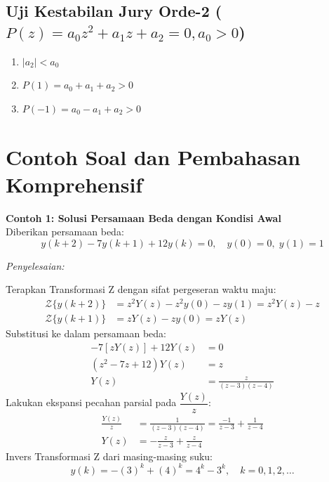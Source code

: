 \documentclass[11pt,a4paper]{article}
\begin{document}
\subsection{Uji Kestabilan Jury Orde-2 (\texorpdfstring{$P(z) = a_0 z^2 + a_1 z + a_2 = 0, a_0 > 0$}{P(z)})}
\begin{enumerate}
    \item $|a_2| < a_0$
    \item $P(1) = a_0 + a_1 + a_2 > 0$
    \item $P(-1) = a_0 - a_1 + a_2 > 0$
\end{enumerate}

\vspace{6pt}

\section{Contoh Soal dan Pembahasan Komprehensif}

\noindent\textbf{Contoh 1: Solusi Persamaan Beda dengan Kondisi Awal}\\
Diberikan persamaan beda:
\begin{equation*}
    y(k+2) - 7y(k+1) + 12y(k) = 0, \quad y(0) = 0, \; y(1) = 1
\end{equation*}

\textit{Penyelesaian:}

Terapkan Transformasi Z dengan sifat pergeseran waktu maju:
\begin{align*}
    \mathcal{Z}\{y(k+2)\} &= z^2 Y(z) - z^2 y(0) - z y(1) = z^2 Y(z) - z \\
    \mathcal{Z}\{y(k+1)\} &= z Y(z) - z y(0) = z Y(z)
\end{align*}
Substitusi ke dalam persamaan beda:
\begin{align*}
    [z^2 Y(z) - z] - 7 [z Y(z)] + 12 Y(z) &= 0 \\
    (z^2 - 7z + 12) Y(z) &= z \\
    Y(z) &= \frac{z}{(z-3)(z-4)}
\end{align*}
Lakukan ekspansi pecahan parsial pada $\dfrac{Y(z)}{z}$:
\begin{align*}
    \frac{Y(z)}{z} &= \frac{1}{(z-3)(z-4)} = \frac{-1}{z-3} + \frac{1}{z-4} \\
    Y(z) &= -\frac{z}{z-3} + \frac{z}{z-4}
\end{align*}
Invers Transformasi Z dari masing-masing suku:
\begin{equation*}
    y(k) = -(3)^k + (4)^k = 4^k - 3^k, \quad k = 0, 1, 2, \dots
\end{equation*}
\end{document}
